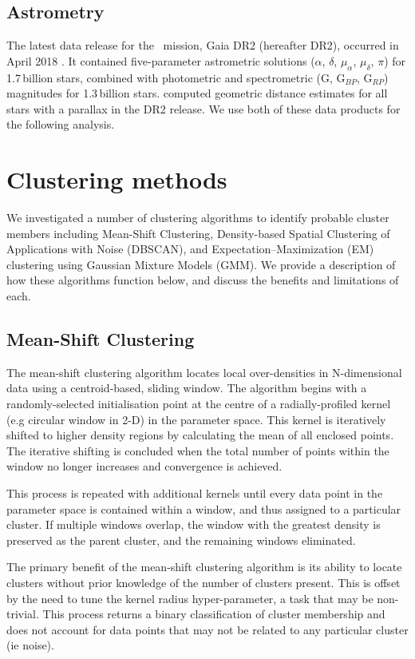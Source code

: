 \subsection{Astrometry}
The latest data release for the \Gaia~mission, Gaia DR2 (hereafter DR2), occurred in April 2018 \citep{gaia_collaboration_gaia_2018}. It contained five-parameter astrometric solutions ($\alpha$, $\delta$, $\mu_{\alpha}$, $\mu_{\delta}$, $\pi$) for 1.7\,billion stars, combined with photometric and spectrometric (G, G$_{BP}$, G$_{RP}$) magnitudes for 1.3\,billion stars. \citet{bailer-jones_estimating_2018} computed geometric distance estimates for all stars with a parallax in the DR2 release. We use both of these data products for the following analysis.

\section{Clustering methods}
We investigated a number of clustering algorithms to identify probable cluster members including Mean-Shift Clustering, Density-based Spatial Clustering of Applications with Noise (DBSCAN), and Expectation–Maximization (EM) clustering using Gaussian Mixture Models (GMM). We provide a description of how these algorithms function below, and discuss the benefits and limitations of each.

\subsection{Mean-Shift Clustering}

The mean-shift clustering algorithm locates local over-densities in N-dimensional data using a centroid-based, sliding window. The algorithm begins with a randomly-selected initialisation point at the centre of a radially-profiled kernel (e.g circular window in 2-D) in the parameter space. This kernel is iteratively shifted to higher density regions by calculating the mean of all enclosed points. The iterative shifting is concluded when the total number of points within the window no longer increases and convergence is achieved. 

This process is repeated with additional kernels until every data point in the parameter space is contained within a window, and thus assigned to a particular cluster. If multiple windows overlap, the window with the greatest density is preserved as the parent cluster, and the remaining windows eliminated.

The primary benefit of the mean-shift clustering algorithm is its ability to locate clusters without prior knowledge of the number of clusters present. This is offset by the need to tune the kernel radius hyper-parameter, a task that may be non-trivial. This process returns a binary classification of cluster membership and does not account for data points that may not be related to any particular cluster (ie noise).


